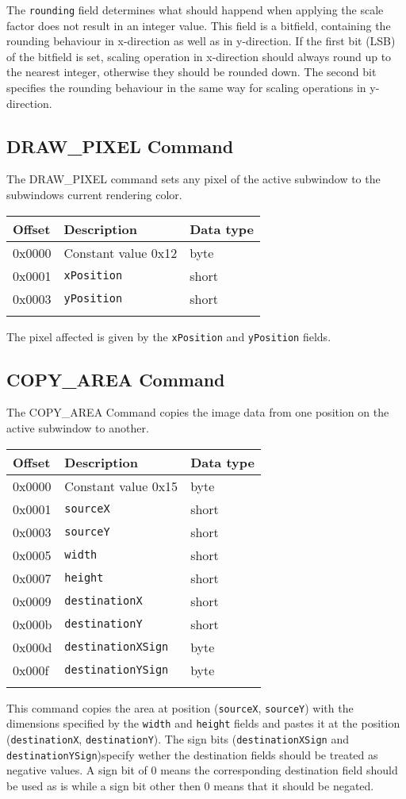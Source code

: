 \documentclass{article}
\newcommand{\field}[1]{\textcolor{fieldColor}{\texttt{#1}}}
\newenvironment{bytelisting}
{\ttfamily \begin{center} \begin{tabular}{l l l} Offset & Description & Data type \\ \hline}
{\normalfont \end{tabular} \end{center}}
\begin{document}
The \field{rounding} field determines what should happend when applying the scale factor does not result in an integer value. This field is a bitfield, containing the rounding behaviour in 
x-direction as well as in y-direction. If the first bit (LSB) of the bitfield is set, scaling operation in x-direction should always round up to the nearest integer, otherwise they should be
rounded down. The second bit specifies the rounding behaviour in the same way for scaling operations in y-direction.

\subsection{DRAW\_PIXEL Command}
The DRAW\_PIXEL command sets any pixel of the active subwindow to the subwindows current rendering color.

\begin{bytelisting}
0x0000 & Constant value 0x12 & byte \\
0x0001 & \field{xPosition} & short \\
0x0003 & \field{yPosition} & short \\
\end{bytelisting}

The pixel affected is given by the \field{xPosition} and \field{yPosition} fields.

\subsection{COPY\_AREA Command}
The COPY\_AREA Command copies the image data from one position on the active subwindow to another.

\begin{bytelisting}
0x0000 & Constant value 0x15 & byte \\
0x0001 & \field{sourceX} & short \\
0x0003 & \field{sourceY} & short \\
0x0005 & \field{width} & short \\
0x0007 & \field{height} & short \\
0x0009 & \field{destinationX} & short \\
0x000b & \field{destinationY} & short \\
0x000d & \field{destinationXSign} & byte \\
0x000f & \field{destinationYSign} & byte \\
\end{bytelisting}

This command copies the area at position (\field{sourceX}, \field{sourceY}) with the dimensions specified by the \field{width} and \field{height} fields and pastes it at the position 
(\field{destinationX}, \field{destinationY}). The sign bits (\field{destinationXSign} and \field{destinationYSign})specify wether the destination fields should be treated as negative values.
A sign bit of 0 means the corresponding destination field should be used as is while a sign bit other then 0 means that it should be negated.
\end{document}

